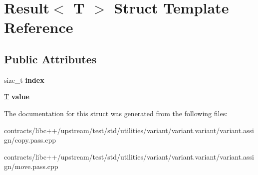 \hypertarget{struct_result}{}\section{Result$<$ T $>$ Struct Template Reference}
\label{struct_result}
\subsection*{Public Attributes}
\begin{DoxyCompactItemize}
\item 
\mbox{\label{struct_result_a0c86eb0ab6b9701ee2bb3af726dee9d1}} 
size\+\_\+t {\bfseries index}
\item 
\mbox{\label{struct_result_a08cdc62a4daa93868d7971ae68eaacce}} 
\mbox{\hyperlink{struct_t}{T}} {\bfseries value}
\end{DoxyCompactItemize}


The documentation for this struct was generated from the following files\+:\begin{DoxyCompactItemize}
\item 
contracts/libc++/upstream/test/std/utilities/variant/variant.\+variant/variant.\+assign/copy.\+pass.\+cpp\item 
contracts/libc++/upstream/test/std/utilities/variant/variant.\+variant/variant.\+assign/move.\+pass.\+cpp\end{DoxyCompactItemize}
